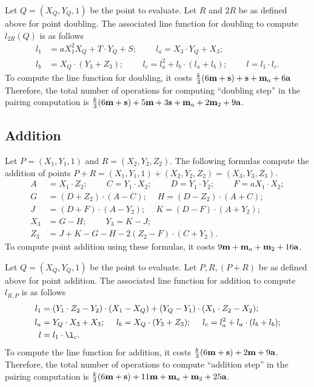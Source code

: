 Let $Q = (X_Q, Y_Q, 1)$ be the point to evaluate.
Let $R$ and $2R$ be as defined above for point doubling.
The associated line function for doubling
to compute $l_{2R}(Q)$ is as follows
\begin{align*}
l_1 &= a X_1^2 X_Q + T \cdot Y_Q + S;\		\qquad
l_a = X_3 \cdot Y_Q + X_3;			\\
l_b &= X_Q \cdot (Y_3 + Z_3);\			\qquad
l_c = l_a^2 + l_b \cdot (l_a + l_b);\		\qquad
l = l_1 \cdot l_c.
\end{align*}
To compute the line function for doubling,
it costs 
$\frac{k}{3}(6\textbf{m} + \textbf{s}) + \textbf{s} + \textbf{m}_{a} + 6\textbf{a}$
Therefore, the total number of operations for computing ``doubling step'' in the pairing computation is
$\frac{k}{3}(6\textbf{m} + \textbf{s}) + 5\textbf{m} +3\textbf{s} + \textbf{m}_{a} + 2\textbf{m}_{2} + 9\textbf{a}$.



\subsection{Addition}
Let $P = (X_1,Y_1,1)$ and $R = (X_2,Y_2,Z_2)$.
The following formulas compute the addition of points
$P + R = (X_1,Y_1,1) + (X_2,Y_2,Z_2) = (X_3,Y_3,Z_3)$.
\begin{align*}
A &= X_1 \cdot Z_2;\	\qquad
C = Y_1 \cdot X_2;\	\qquad
D = Y_1 \cdot Y_2;\	\qquad
F = a X_1 \cdot X_2;\\
G &= (D + Z_2) \cdot (A - C);\	\quad
H = (D - Z_2) \cdot (A + C);\\
J &= (D + F) \cdot (A - Y_2);\	\quad
K = (D - F) \cdot (A + Y_2);\\
X_3 &= G - H;\	\qquad
Y_3 = K - J;\\
Z_3 &= J + K - G - H - 2(Z_2 - F) \cdot (C + Y_2).
\end{align*}
To compute point addition using these formulas,
it costs $9\textbf{m} + \textbf{m}_{a} + \textbf{m}_{2} + 16\textbf{a}$.

Let $Q = (X_Q,Y_Q,1)$ be the point to evaluate.
Let $P,R,(P+R)$ be as defined above for point addition.
The associated line function for addition
to compute $l_{R,P}$ is as follows
\begin{align*}
l_1 &= (Y_1 \cdot Z_2 - Y_2) \cdot (X_1 - X_Q) + (Y_Q - Y_1) \cdot (X_1 \cdot Z_2 - X_2);\\
l_a &= Y_Q \cdot X_3 + X_3;\	\quad
l_b = X_Q \cdot (Y_3 + Z_3);\	\quad
l_c = l_a^2 + l_a \cdot (l_b + l_b);\\
l &= l_1 \cdot \l_c.
\end{align*}
To compute the line function for addition,
it costs
$\frac{k}{3}(6\textbf{m} + \textbf{s}) + 2\textbf{m} + 9\textbf{a}$.
Therefore, the total number of operations to compute ``addition step'' in the pairing computation is
$\frac{k}{3}(6\textbf{m} + \textbf{s}) + 11\textbf{m} + \textbf{m}_{a} + \textbf{m}_{2} + 25\textbf{a}$.



